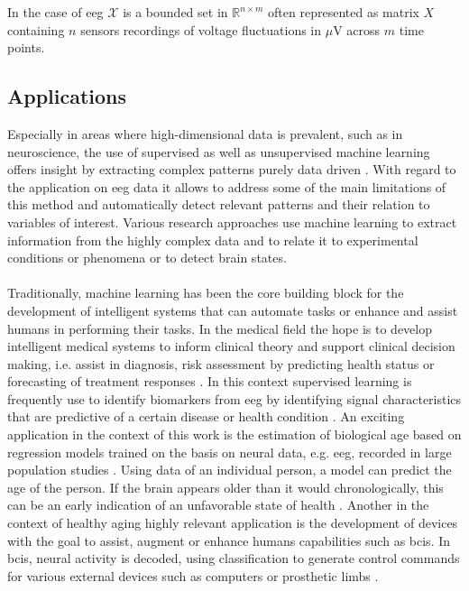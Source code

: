 In the case of \gls{eeg} $\mathcal{X}$ is a bounded set in $\mathbb{R}^{n\times m}$ often represented as matrix $X$ containing $n$ sensors recordings of voltage fluctuations in $\mu$V across $m$ time points. 


\subsection{Applications}
Especially in areas where high-dimensional data is prevalent, such as in neuroscience, the use of supervised as well as unsupervised machine learning offers insight by extracting complex patterns purely data driven \cite{Bzdok2017}. With regard to the application on \gls{eeg} data it allows to address some of the main limitations of this method and automatically detect relevant patterns and their relation to variables of interest. Various research approaches use machine learning to extract information from the highly complex data and to relate it to experimental conditions or phenomena or to detect brain states.\\
\\
Traditionally, machine learning has been the core building block for the development of intelligent systems that can automate tasks or enhance and assist humans in performing their tasks. In the medical field the hope is to develop intelligent medical systems to inform clinical theory and support clinical decision making, i.e. assist in diagnosis, risk assessment by predicting health status or forecasting of treatment responses \cite{Woo2017}. In this context supervised learning is frequently use to identify biomarkers from \gls{eeg} by identifying signal characteristics that are predictive of a certain disease or health condition \cite{Babiloni_AlzCons2021,Mei2021}. An exciting application in the context of this work is the estimation of biological age based on regression models trained on the basis on neural data, e.g. \gls{eeg}, recorded in large population studies \cite{Engemann2022}. Using data of an individual person, a model can predict the age of the person. If the brain appears older than it would chronologically, this can be an early indication of an unfavorable state of health \cite{Gonneaud2021}. Another in the context of healthy aging highly relevant application is the development of devices with the goal to assist, augment or enhance humans capabilities such as \glspl{bci}. In \glspl{bci}, neural activity is decoded, using classification to generate control commands for various external devices such as computers or prosthetic limbs \cite{Saha2021, Anumanchipalli2019}.\\
